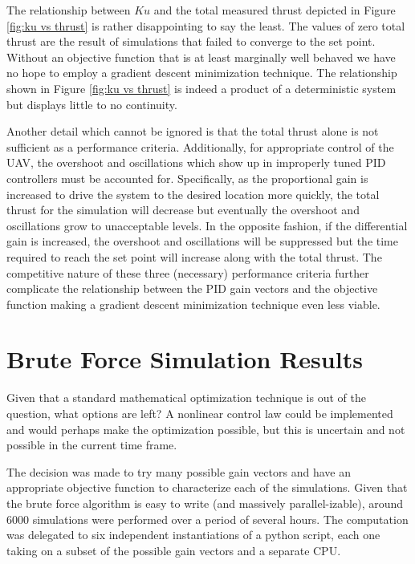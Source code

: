 The relationship between $Ku$ and the total measured thrust depicted in Figure \ref{fig:ku vs thrust} is rather disappointing to say the least. The values of zero total thrust are the result of simulations that failed to converge to the set point. Without an objective function that is at least marginally well behaved we have no hope to employ a gradient descent minimization technique. The relationship shown in Figure \ref{fig:ku vs thrust} is indeed a product of a deterministic system but displays little to no continuity.

Another detail which cannot be ignored is that the total thrust alone is not sufficient as a performance criteria. Additionally, for appropriate control of the UAV,  the overshoot and oscillations which show up in improperly tuned PID controllers must be accounted for. Specifically, as the proportional gain is increased to drive the system to the desired location more quickly, the total thrust for the simulation will decrease but eventually the overshoot and oscillations grow to unacceptable levels. In the opposite fashion, if the differential gain is increased, the overshoot and oscillations will be suppressed but the time required to reach the set point will increase along with the total thrust. The competitive nature of these three (necessary) performance criteria further complicate the relationship between the PID gain vectors and the objective function making a gradient descent minimization technique even less viable.


\section{Brute Force Simulation Results}

Given that a standard mathematical optimization technique is out of the question, what options are left? A nonlinear control law could be implemented and would perhaps make the optimization possible, but this is uncertain and not possible in the current time frame.

The decision was made to try many possible gain vectors and have an appropriate objective function to characterize each of the simulations. Given that  the brute force algorithm is easy to write (and massively parallel-izable), around 6000 simulations were performed over a period of several hours. The computation was delegated to six independent instantiations of a python script, each one taking on a subset of the possible gain vectors and a separate CPU.

